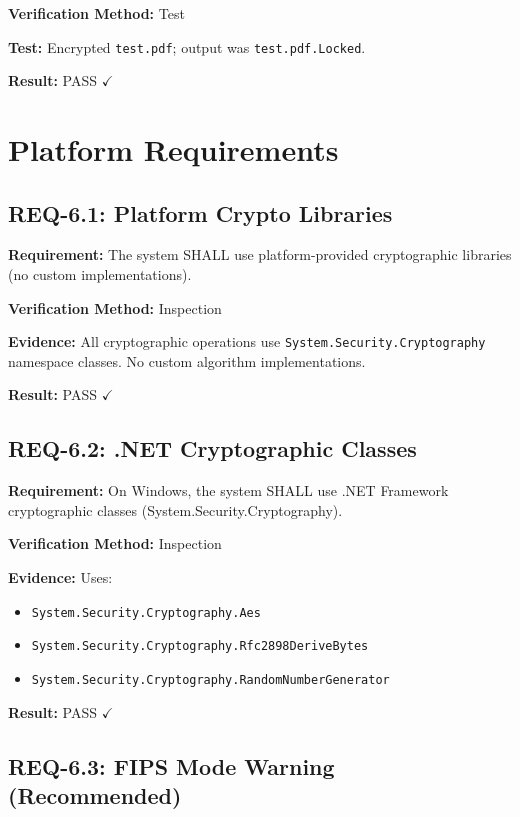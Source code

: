 \documentclass[11pt,letterpaper]{article}
\begin{document}
\textbf{Verification Method:} Test

\textbf{Test:} Encrypted \texttt{test.pdf}; output was \texttt{test.pdf.Locked}.

\textbf{Result:} PASS $\checkmark$

\newpage
\section{Platform Requirements}

\subsection{REQ-6.1: Platform Crypto Libraries}

\textbf{Requirement:} The system SHALL use platform-provided cryptographic libraries (no custom implementations).

\textbf{Verification Method:} Inspection

\textbf{Evidence:} All cryptographic operations use \texttt{System.Security.Cryptography} namespace classes. No custom algorithm implementations.

\textbf{Result:} PASS $\checkmark$

\subsection{REQ-6.2: .NET Cryptographic Classes}

\textbf{Requirement:} On Windows, the system SHALL use .NET Framework cryptographic classes (System.Security.Cryptography).

\textbf{Verification Method:} Inspection

\textbf{Evidence:} Uses:
\begin{itemize}
    \item \texttt{System.Security.Cryptography.Aes}
    \item \texttt{System.Security.Cryptography.Rfc2898DeriveBytes}
    \item \texttt{System.Security.Cryptography.RandomNumberGenerator}
\end{itemize}

\textbf{Result:} PASS $\checkmark$

\subsection{REQ-6.3: FIPS Mode Warning (Recommended)}
\end{document}
